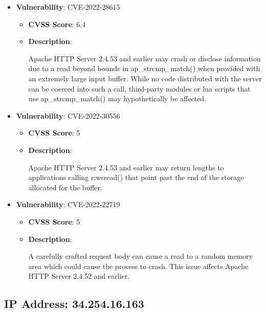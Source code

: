 \documentclass{article}
\begin{document}
\begin{itemize}
        \item \textbf{Vulnerability}: CVE-2022-28615
        \begin{itemize}
            \item \textbf{CVSS Score}:  6.4 
            \item \textbf{Description}:
            \parbox[t]{0.9\linewidth}{
                \ttfamily Apache HTTP Server 2.4.53 and earlier may crash or disclose information due to a read beyond bounds in ap\_strcmp\_match() when provided with an extremely large input buffer. While no code distributed with the server can be coerced into such a call, third-party modules or lua scripts that use ap\_strcmp\_match() may hypothetically be affected.
            }
        \end{itemize}
    
        \item \textbf{Vulnerability}: CVE-2022-30556
        \begin{itemize}
            \item \textbf{CVSS Score}:  5 
            \item \textbf{Description}:
            \parbox[t]{0.9\linewidth}{
                \ttfamily Apache HTTP Server 2.4.53 and earlier may return lengths to applications calling r:wsread() that point past the end of the storage allocated for the buffer.
            }
        \end{itemize}
    
        \item \textbf{Vulnerability}: CVE-2022-22719
        \begin{itemize}
            \item \textbf{CVSS Score}:  5 
            \item \textbf{Description}:
            \parbox[t]{0.9\linewidth}{
                \ttfamily A carefully crafted request body can cause a read to a random memory area which could cause the process to crash. This issue affects Apache HTTP Server 2.4.52 and earlier.
            }
        \end{itemize}
    
\end{itemize}




\clearpage



\subsection*{IP Address: 34.254.16.163}
\end{document}
